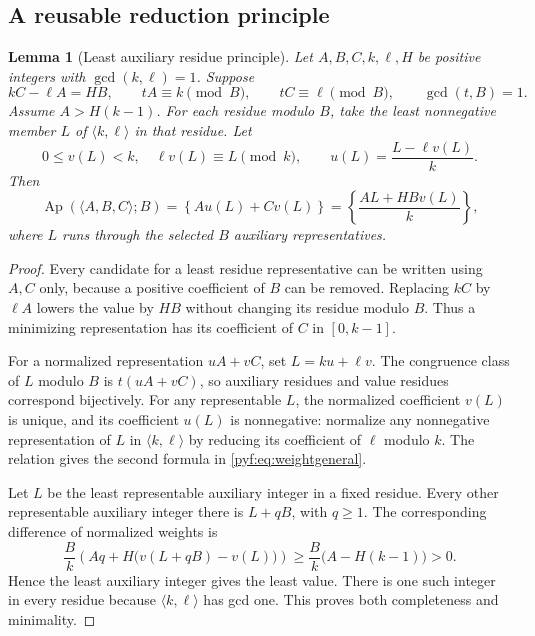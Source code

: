 \documentclass[11pt,a4paper]{article}
\numberwithin{equation}{section}
\newtheorem{lemma}[theorem]{Lemma}
\theoremstyle{definition}
\newcommand{\Ap}{\operatorname{Ap}}
\begin{document}
\subsection{A reusable reduction principle}

\begin{lemma}[Least auxiliary residue principle]\label{pyf:lem:aux}
Let $A,B,C,k,\ell,H$ be positive integers with $\gcd(k,\ell)=1$. Suppose
\[
kC-\ell A=HB,
\qquad tA\equiv k\pmod B,\qquad tC\equiv\ell\pmod B,
\qquad \gcd(t,B)=1.
\]
Assume $A>H(k-1)$. For each residue modulo $B$, take the least nonnegative
member $L$ of $\langle k,\ell\rangle$ in that residue. Let
\[
0\leq v(L)<k,\quad \ell v(L)\equiv L\pmod k,
\qquad u(L)=\frac{L-\ell v(L)}k.
\]
Then
\begin{equation}\label{pyf:eq:weightgeneral}
\Ap(\langle A,B,C\rangle;B)
=\left\{Au(L)+Cv(L)\right\}
=\left\{\frac{AL+HBv(L)}k\right\},
\end{equation}
where $L$ runs through the selected $B$ auxiliary representatives.
\end{lemma}

\begin{proof}
Every candidate for a least residue representative can be written using
$A,C$ only, because a positive coefficient of $B$ can be removed. Replacing
$kC$ by $\ell A$ lowers the value by $HB$ without changing its residue
modulo $B$. Thus a minimizing representation has its coefficient of $C$
in $[0,k-1]$.

For a normalized representation $uA+vC$, set $L=ku+\ell v$.
The congruence class of $L$ modulo $B$ is $t(uA+vC)$, so auxiliary residues
and value residues correspond bijectively. For any representable $L$, the
normalized coefficient $v(L)$ is unique, and its coefficient $u(L)$ is
nonnegative: normalize any nonnegative representation of $L$ in
$\langle k,\ell\rangle$ by reducing its coefficient of $\ell$ modulo $k$.
The relation gives the second formula in \eqref{pyf:eq:weightgeneral}.

Let $L$ be the least representable auxiliary integer in a fixed residue.
Every other representable auxiliary integer there is $L+qB$, with $q\geq1$.
The corresponding difference of normalized weights is
\[
\frac{B}{k}\left(Aq+H\bigl(v(L+qB)-v(L)\bigr)\right)
\geq\frac{B}{k}\bigl(A-H(k-1)\bigr)>0.
\]
Hence the least auxiliary integer gives the least value. There is one such
integer in every residue because $\langle k,\ell\rangle$ has gcd one.
This proves both completeness and minimality.
\end{proof}
\end{document}
